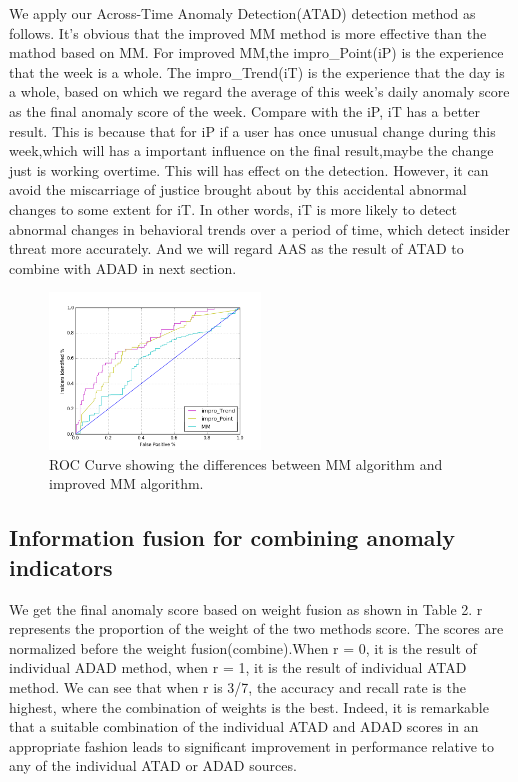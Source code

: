 \documentclass[conference]{IEEEtran}
\begin{document}
We apply our Across-Time Anomaly Detection(ATAD) detection method as follows. It's obvious that the improved MM method is more effective than the mathod based on MM. For improved MM,the impro\_Point(iP) is the experience that the week is a whole. The impro\_Trend(iT) is the experience that the day is a whole, based on which we regard the average of this week's daily anomaly score as the final anomaly score of the week. Compare with the iP, iT has a better result. This is because that for  iP if a user has once unusual change during this week,which will has a important influence on the final result,maybe the change just is working overtime. This will has effect on the detection. However, it can avoid the miscarriage of justice brought about by this accidental abnormal changes to some extent for  iT. In other words,  iT is more likely to detect abnormal changes in behavioral trends over a period of time, which detect insider threat more accurately. And we will regard AAS as the result of ATAD to combine with ADAD in next section.

\begin{figure}[htb]
\centerline{\includegraphics[width = 0.5\textwidth]{figure/figure7.png}}
\caption{ROC Curve showing the differences between MM algorithm and improved MM algorithm.}
\label{fig}
\end{figure}


\subsection{Information fusion for combining anomaly indicators}

We get the final anomaly score based on weight fusion as shown in Table 2. r represents the proportion of the weight of the two methods score. The scores are normalized before the weight fusion(combine).When r = 0, it is the result of individual ADAD method, when r = 1, it is the result of individual ATAD method. We can see that when r is 3/7, the accuracy and recall rate is the highest, where the combination of weights is the best. Indeed, it is remarkable that a suitable combination of the individual ATAD and ADAD scores in an appropriate fashion leads to significant improvement in performance relative to any of the individual ATAD or ADAD sources.
\end{document}

